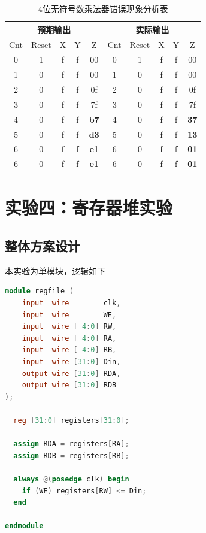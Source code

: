 \documentclass[12pt, a4paper]{ctexart}
\begin{document}
\begin{table}[H]
    \centering
    \begin{tabular}{|ccccc|ccccc|}
        \hline
        \multicolumn{5}{|c|}{预期输出} & \multicolumn{5}{c|}{实际输出} \\
        \hline
        Cnt & Reset & X & Y & Z & Cnt & Reset & X & Y & Z \\
        \hline
        0 & 1 & f & f & 00 & 0 & 1 & f & f & 00 \\
        1 & 0 & f & f & 00 & 1 & 0 & f & f & 00 \\
        2 & 0 & f & f & 0f & 2 & 0 & f & f & 0f \\
        3 & 0 & f & f & 7f & 3 & 0 & f & f & 7f \\
        4 & 0 & f & f & \textbf{b7} & 4 & 0 & f & f & \textbf{37} \\
        5 & 0 & f & f & \textbf{d3} & 5 & 0 & f & f & \textbf{13} \\
        6 & 0 & f & f & \textbf{e1} & 6 & 0 & f & f & \textbf{01} \\
        6 & 0 & f & f & \textbf{e1} & 6 & 0 & f & f & \textbf{01} \\
        \hline
    \end{tabular}
    \caption{4位无符号数乘法器错误现象分析表}
\end{table}

\section{实验四：寄存器堆实验}

\subsection{整体方案设计}

本实验为单模块，逻辑如下

\begin{lstlisting}[language=Verilog, caption={寄存器堆模块}]
module regfile (
    input  wire        clk,
    input  wire        WE,
    input  wire [ 4:0] RW,
    input  wire [ 4:0] RA,
    input  wire [ 4:0] RB,
    input  wire [31:0] Din,
    output wire [31:0] RDA,
    output wire [31:0] RDB
);

  reg [31:0] registers[31:0];

  assign RDA = registers[RA];
  assign RDB = registers[RB];

  always @(posedge clk) begin
    if (WE) registers[RW] <= Din;
  end

endmodule
\end{lstlisting}
\end{document}
